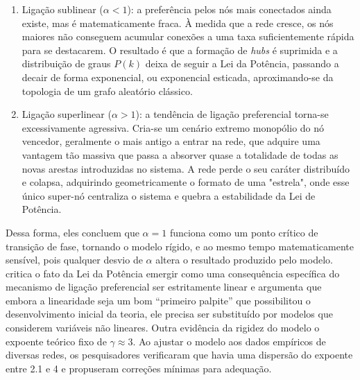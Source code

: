 \documentclass[12pt,oneside,a4paper,brazil,sumario=tradicional]{abntex2}
\begin{document}
\begin{enumerate}
  \item Ligação sublinear ($\alpha < 1$):  a preferência pelos nós mais conectados ainda existe, mas é matematicamente fraca. À medida que a rede cresce, os nós maiores não conseguem acumular conexões a uma taxa suficientemente rápida para se destacarem. O resultado é que a formação de \textit{hubs }é suprimida e a distribuição de graus $P(k)$ deixa de seguir a Lei da Potência, passando a decair de forma exponencial, ou exponencial esticada, aproximando-se da topologia de um grafo aleatório clássico.
  \item Ligação superlinear ($\alpha > 1$): a tendência de ligação preferencial torna-se excessivamente agressiva. Cria-se um cenário extremo monopólio do nó vencedor, geralmente o mais antigo a entrar na rede, que adquire uma vantagem tão massiva que passa a absorver quase a totalidade de todas as novas arestas introduzidas no sistema. A rede perde o seu caráter distribuído e colapsa, adquirindo geometricamente o formato de uma "estrela", onde esse único super-nó centraliza o sistema e quebra a estabilidade da Lei de Potência.
\end{enumerate}

Dessa forma, eles concluem que $\alpha = 1$ funciona como um ponto crítico de transição de fase, tornando o modelo rígido, e ao mesmo tempo matematicamente sensível, pois qualquer desvio de $\alpha$ altera o resultado produzido pelo modelo. \textcite{newman2010} critica o fato da Lei da Potência emergir como uma consequência específica do mecanismo de ligação preferencial ser estritamente linear e argumenta que embora a linearidade seja um bom “primeiro palpite” que possibilitou o desenvolvimento inicial da teoria, ele precisa ser substituído por modelos que considerem variáveis não lineares. Outra evidência da rigidez do modelo o expoente teórico fixo de $\gamma \approx 3$. Ao ajustar o modelo aos dados empíricos de diversas redes, os pesquisadores verificaram que havia uma dispersão do expoente entre 2.1 e 4 e propuseram correções mínimas para adequação.
\end{document}
